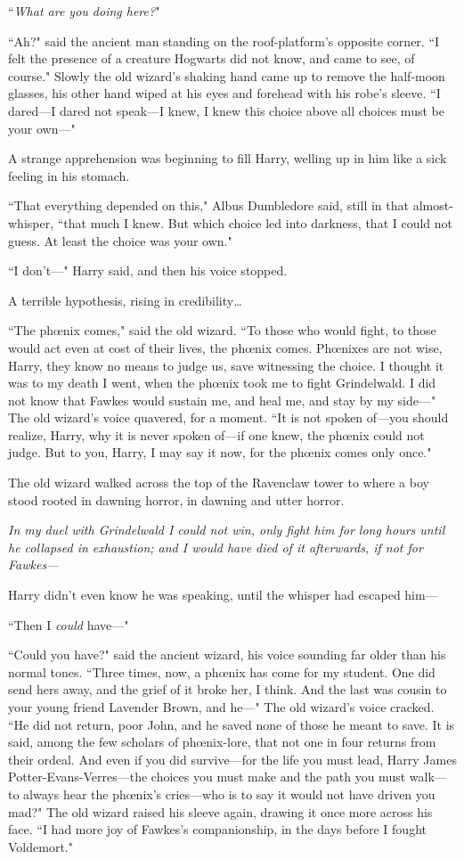 ``\emph{What are you doing here?}"

``Ah?" said the ancient man standing on the roof-platform's opposite corner. ``I felt the presence of a creature Hogwarts did not know, and came to see, of course." Slowly the old wizard's shaking hand came up to remove the half-moon glasses, his other hand wiped at his eyes and forehead with his robe's sleeve. ``I dared—I dared not speak—I knew, I knew this choice above all choices must be your own—"

A strange apprehension was beginning to fill Harry, welling up in him like a sick feeling in his stomach.

``That everything depended on this," Albus Dumbledore said, still in that almost-whisper, ``that much I knew. But which choice led into darkness, that I could not guess. At least the choice was your own."

``I don't—" Harry said, and then his voice stopped.

A terrible hypothesis, rising in credibility{\ldots}

``The phœnix comes," said the old wizard. ``To those who would fight, to those would act even at cost of their lives, the phœnix comes. Phœnixes are not wise, Harry, they know no means to judge us, save witnessing the choice. I thought it was to my death I went, when the phœnix took me to fight Grindelwald. I did not know that Fawkes would sustain me, and heal me, and stay by my side—" The old wizard's voice quavered, for a moment. ``It is not spoken of—you should realize, Harry, why it is never spoken of—if one knew, the phœnix could not judge. But to you, Harry, I may say it now, for the phœnix comes only once."

The old wizard walked across the top of the Ravenclaw tower to where a boy stood rooted in dawning horror, in dawning and utter horror.

\emph{In my duel with Grindelwald I could not win, only fight him for long hours until he collapsed in exhaustion; and I would have died of it afterwards, if not for Fawkes—}

Harry didn't even know he was speaking, until the whisper had escaped him—

``Then I \emph{could} have—"

``Could you have?" said the ancient wizard, his voice sounding far older than his normal tones. ``Three times, now, a phœnix has come for my student. One did send hers away, and the grief of it broke her, I think. And the last was cousin to your young friend Lavender Brown, and he—" The old wizard's voice cracked. ``He did not return, poor John, and he saved none of those he meant to save. It is said, among the few scholars of phœnix-lore, that not one in four returns from their ordeal. And even if you did survive—for the life you must lead, Harry James Potter-Evans-Verres—the choices you must make and the path you must walk—to always hear the phœnix's cries—who is to say it would not have driven you mad?" The old wizard raised his sleeve again, drawing it once more across his face. ``I had more joy of Fawkes's companionship, in the days before I fought Voldemort."

